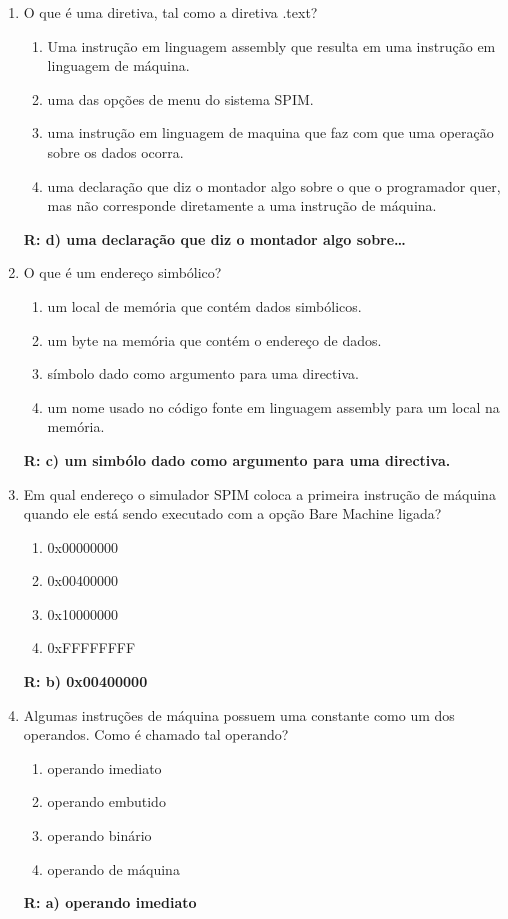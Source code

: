 \documentclass[a4paper,11pt]{article}
\begin{document}
\begin{enumerate}
    \item{O que é uma diretiva, tal como a diretiva .text?}
        \begin{enumerate}
            \item{Uma instrução em linguagem assembly que resulta em uma instrução em linguagem de
                    máquina.}
            \item{uma das opções de menu do sistema SPIM.}
            \item{uma instrução em linguagem de maquina que faz com que uma operação sobre os dados ocorra.}
            \item{uma declaração que diz o montador algo sobre o que o programador quer, mas não
                    corresponde diretamente a uma instrução de máquina.}
        \end{enumerate}
        \textbf{R: d) uma declaração que diz o montador algo sobre\dots}

    \item{O que é um endereço simbólico?}
        \begin{enumerate}
            \item{um local de memória que contém dados simbólicos.}
            \item{um byte na memória que contém o endereço de dados.}
            \item{símbolo dado como argumento para uma directiva.}
            \item{um nome usado no código fonte em linguagem assembly para um local na memória.}
        \end{enumerate}
        \textbf{R: c) um simbólo dado como argumento para uma directiva.}

        \newpage 

    \item{Em qual endereço o simulador SPIM coloca a primeira instrução de máquina quando ele está sendo
            executado com a opção Bare Machine ligada?}
        \begin{enumerate}
            \item{0x00000000}
            \item{0x00400000}
            \item{0x10000000}
            \item{0xFFFFFFFF}
        \end{enumerate}
        \textbf{R: b) 0x00400000}

    \item{Algumas instruções de máquina possuem uma constante como um dos operandos. Como é chamado tal
            operando?}
        \begin{enumerate}
            \item{operando imediato}
            \item{operando embutido}
            \item{operando binário}
            \item{operando de máquina}
        \end{enumerate}
        \textbf{R: a) operando imediato}


\end{enumerate}
\end{document}
